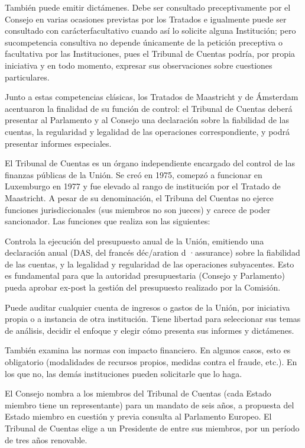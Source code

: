\documentclass[10pt,a4paper]{article}
\begin{document}
También puede emitir dictámenes. Debe ser consultado preceptivamente por el Consejo en varias ocasiones previstas por los Tratados e igualmente puede ser consultado con carácterfacultativo cuando así lo solicite alguna Institución; pero sucompetencia consultiva no depende únicamente de la petición preceptiva o facultativa por las Instituciones, pues el Tribunal de Cuentas podría, por propia iniciativa y en todo momento, expresar sus observaciones sobre cuestiones particulares.

Junto a estas competencias clásicas, los Tratados de Maastricht y de Ámsterdam acentuaron la finalidad de su función de control: el Tribunal de Cuentas deberá presentar al Parlamento y al Consejo una declaración sobre la fiabilidad de las cuentas, la regularidad y legalidad de las operaciones correspondiente, y podrá presentar informes especiales.












El Tribunal de Cuentas es un órgano independiente encargado del control de las finanzas públicas de la Unión. Se creó en 1975, comepzó a funcionar en Luxemburgo en 1977 y fue elevado al rango de institución por el Tratado de Maastricht. A pesar de su denominación, el Tribuna del Cuentas no ejerce funciones jurisdiccionales (sus miembros no son jueces) y carece de poder sancionador. Las funciones que realiza son las siguientes:

Controla la ejecución del presupuesto anual de la Unión, emitiendo una declaración anual (DAS, del francés déc/aration d ·assurance) sobre la fiabilidad de las cuentas, y la legalidad y regularidad de las operaciones subyacentes. Esto es fundamental para que la autoridad presupuestaria (Consejo y Parlamento) pueda aprobar ex-post la gestión del presupuesto realizado por la Comisión.

Puede auditar cualquier cuenta de ingresos o gastos de la Unión, por iniciativa propia o a instancia de otra institución. Tiene libertad para seleccionar sus temas de análisis, decidir el enfoque y elegir cómo presenta sus informes y dictámenes.

También examina las normas con impacto financiero. En algunos casos, esto es obligatorio (modalidades de recursos propios, medidas contra el fraude, etc.). En los que no, las demás instituciones pueden solicitarle que lo haga.

El Consejo nombra a los miembros del Tribunal de Cuentas (cada Estado miembro tiene un representante) para un mandato de seis años, a propuesta del Estado miembro en cuestión y previa consulta al Parlamento Europeo. El Tribunal de Cuentas elige a un Presidente de entre sus miembros, por un período de tres años renovable.
\end{document}
